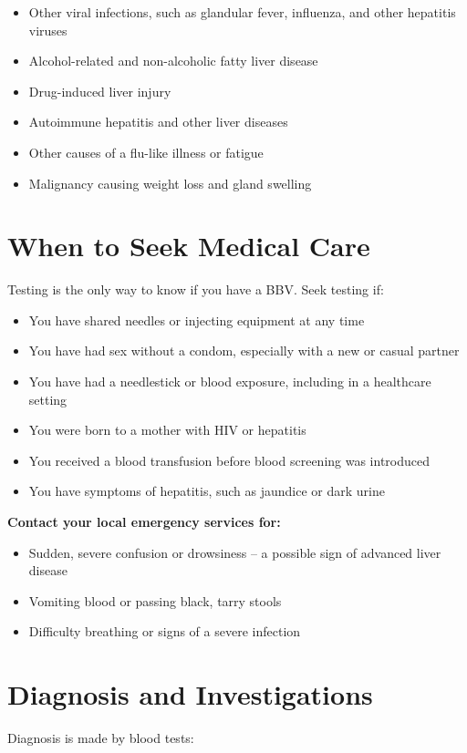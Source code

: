 \begin{itemize}
    \item Other viral infections, such as glandular fever, influenza, and other hepatitis viruses
    \item Alcohol-related and non-alcoholic fatty liver disease
    \item Drug-induced liver injury
    \item Autoimmune hepatitis and other liver diseases
    \item Other causes of a flu-like illness or fatigue
    \item Malignancy causing weight loss and gland swelling
\end{itemize}

\section*{When to Seek Medical Care}
Testing is the only way to know if you have a BBV. Seek testing if:

\begin{itemize}
    \item You have shared needles or injecting equipment at any time
    \item You have had sex without a condom, especially with a new or casual partner
    \item You have had a needlestick or blood exposure, including in a healthcare setting
    \item You were born to a mother with HIV or hepatitis
    \item You received a blood transfusion before blood screening was introduced
    \item You have symptoms of hepatitis, such as jaundice or dark urine
\end{itemize}

\textbf{Contact your local emergency services for:}
\begin{itemize}
    \item Sudden, severe confusion or drowsiness -- a possible sign of advanced liver disease
    \item Vomiting blood or passing black, tarry stools
    \item Difficulty breathing or signs of a severe infection
\end{itemize}

\section*{Diagnosis and Investigations}
Diagnosis is made by blood tests:

